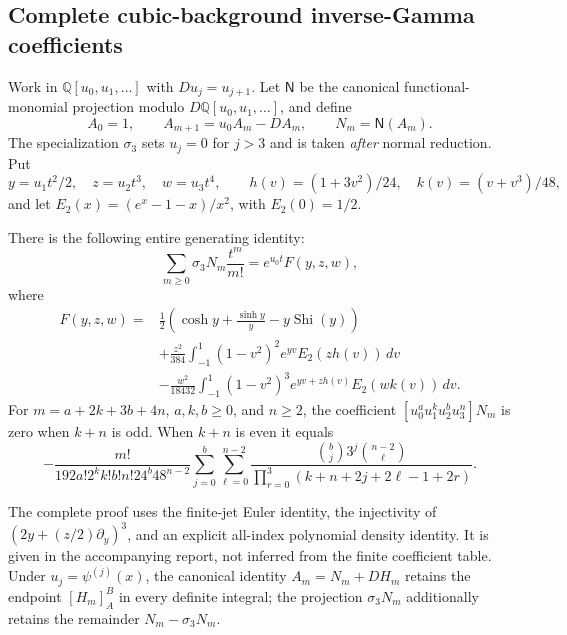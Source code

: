 \subsection{Complete cubic-background inverse-Gamma coefficients}
\label{cgnf:section}

Work in $\mathbb Q[u_0,u_1,\ldots]$ with $D u_j=u_{j+1}$.
Let $\mathsf N$ be the canonical functional-monomial projection modulo
$D\mathbb Q[u_0,u_1,\ldots]$, and define
\[
 A_0=1,\qquad A_{m+1}=u_0A_m-DA_m,\qquad N_m=\mathsf N(A_m).
\]
The specialization $\sigma_3$ sets $u_j=0$ for $j>3$ and is taken
\emph{after} normal reduction. Put
\[
 y=u_1t^2/2,\quad z=u_2t^3,\quad w=u_3t^4,\qquad
 h(v)=(1+3v^2)/24,\quad k(v)=(v+v^3)/48,
\]
and let $E_2(x)=(e^x-1-x)/x^2$, with $E_2(0)=1/2$.

\begin{theorem}\label{cgnf:main}
There is the following entire generating identity:
\[
 \sum_{m\ge0}\sigma_3N_m\frac{t^m}{m!}=e^{u_0t}F(y,z,w),
\]
where
\begin{align*}
 F(y,z,w)={}&\frac12\left(\cosh y+\frac{\sinh y}{y}
                         -y\operatorname{Shi}(y)\right)\\
 &+\frac{z^2}{384}\int_{-1}^1(1-v^2)^2e^{yv}E_2(zh(v))\,dv\\
 &-\frac{w^2}{18432}\int_{-1}^1(1-v^2)^3e^{yv+zh(v)}E_2(wk(v))\,dv.
\end{align*}
For $m=a+2k+3b+4n$, $a,k,b\ge0$, and $n\ge2$, the coefficient
$[u_0^a u_1^k u_2^b u_3^n]N_m$ is zero when $k+n$ is odd. When
$k+n$ is even it equals
\[
 -\frac{m!}{192a!2^kk!b!n!24^b48^{n-2}}
 \sum_{j=0}^b\sum_{\ell=0}^{n-2}
 \frac{\binom bj3^j\binom{n-2}{\ell}}
 {\prod_{r=0}^3(k+n+2j+2\ell-1+2r)}.
\]
\end{theorem}

The complete proof uses the finite-jet Euler identity, the injectivity of
$(2y+(z/2)\partial_y)^3$, and an explicit all-index polynomial density
identity. It is given in the accompanying report, not inferred from the
finite coefficient table. Under $u_j=\psi^{(j)}(x)$, the canonical
identity $A_m=N_m+DH_m$ retains the endpoint $[H_m]_A^B$ in every definite
integral; the projection $\sigma_3N_m$ additionally retains the remainder
$N_m-\sigma_3N_m$.
